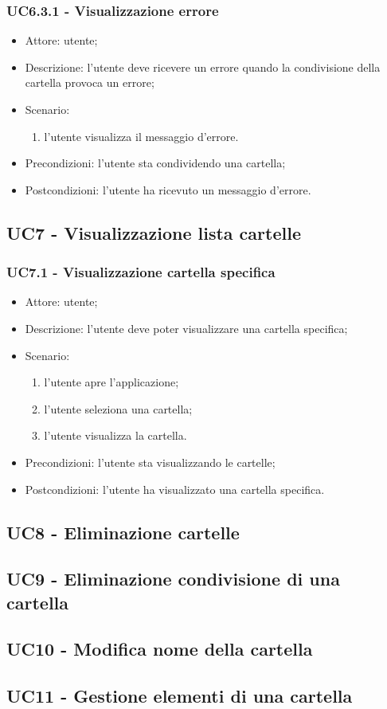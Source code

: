    \subsubsection{UC6.3.1 - Visualizzazione errore }
    \begin{itemize}
        \item Attore: utente;
        \item Descrizione: l'utente deve ricevere un errore quando la condivisione della cartella provoca un errore;
        \item Scenario:
        \begin{enumerate}
        \item l'utente visualizza il messaggio d'errore.
        \end{enumerate}   
        \item Precondizioni: l'utente sta condividendo una cartella;
        \item Postcondizioni: l'utente ha ricevuto un messaggio d'errore.
    \end{itemize}

    \subsection{UC7 - Visualizzazione lista cartelle}

    \subsubsection{UC7.1 - Visualizzazione cartella specifica}
    \begin{itemize}
        \item Attore: utente;
        \item Descrizione: l'utente deve poter visualizzare una cartella specifica;
        \item Scenario:
        \begin{enumerate}
        \item l'utente apre l'applicazione;
        \item l'utente seleziona una cartella;
        \item l'utente visualizza la cartella.
        \end{enumerate}
        \item Precondizioni: l'utente sta visualizzando le cartelle;
        \item Postcondizioni: l'utente ha visualizzato una cartella specifica.
    \end{itemize}

    \subsection{UC8 - Eliminazione cartelle}

    \subsection{UC9 - Eliminazione condivisione di una cartella}

    \subsection{UC10 - Modifica nome della cartella}

    \subsection{UC11 - Gestione elementi di una cartella}
